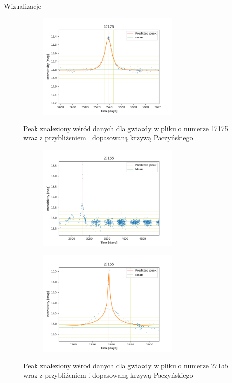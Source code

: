\documentclass[a4paper,11pt]{article}
\begin{document}
\begin{subsection}{Wizualizacje}
\begin{figure}[H]
\begin{subfigure}{0.5\textwidth}
\label{Fig_6}
\end{subfigure}
\begin{subfigure}{0.5\textwidth}
\centering
\includegraphics[width=\linewidth,height=5.25cm]{17175_v.png}
\label{Fig_7}
\end{subfigure}
\caption{Peak znaleziony wśród danych dla gwiazdy w pliku o numerze 17175 wraz z przybliżeniem i dopasowaną krzywą Paczyńskiego}
\end{figure}
\begin{figure}[H]
\begin{subfigure}{0.5\textwidth}
\centering
\includegraphics[width=\linewidth,height=5.25cm]{27155.png}
\label{Fig_8}
\end{subfigure}
\begin{subfigure}{0.5\textwidth}
\centering
\includegraphics[width=\linewidth,height=5.25cm]{27155_v.png}
\label{Fig_9}
\end{subfigure}
\caption{Peak znaleziony wśród danych dla gwiazdy w pliku o numerze 27155 wraz z przybliżeniem i dopasowaną krzywą Paczyńskiego}

\end{figure}
\end{subsection}
\end{document}

